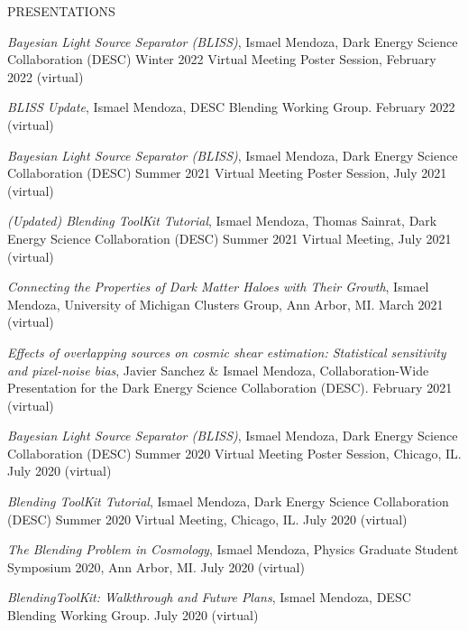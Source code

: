 \begin{rSection}{PRESENTATIONS}
%
\vspace*{-1em}

\item \textit{Bayesian Light Source Separator (BLISS)}, Ismael Mendoza, Dark Energy Science Collaboration (DESC) Winter 2022 Virtual Meeting Poster Session, February 2022 (virtual)

\item \textit{BLISS Update}, Ismael Mendoza, DESC Blending Working Group. February 2022 (virtual)

\item \textit{Bayesian Light Source Separator (BLISS)}, Ismael Mendoza, Dark Energy Science Collaboration (DESC) Summer 2021 Virtual Meeting Poster Session, July 2021 (virtual)

\item  \textit{(Updated) Blending ToolKit Tutorial}, Ismael Mendoza, Thomas Sainrat, Dark Energy Science Collaboration (DESC) Summer 2021 Virtual Meeting, July 2021 (virtual)

\item \textit{Connecting the Properties of Dark Matter Haloes with Their Growth}, Ismael Mendoza, University of Michigan Clusters Group, Ann Arbor, MI. March 2021 (virtual)
%
\item \textit{Effects of overlapping sources on cosmic shear estimation: Statistical sensitivity and pixel-noise bias}, Javier Sanchez \& Ismael Mendoza, Collaboration-Wide Presentation for the Dark Energy Science Collaboration (DESC). February 2021 (virtual)
%
\item \textit{Bayesian Light Source Separator (BLISS)}, Ismael Mendoza, Dark Energy Science Collaboration (DESC) Summer 2020 Virtual Meeting Poster Session, Chicago, IL. July 2020 (virtual)
%
\item  \textit{Blending ToolKit Tutorial}, Ismael Mendoza, Dark Energy Science Collaboration (DESC) Summer 2020 Virtual Meeting, Chicago, IL. July 2020 (virtual)
%
\item \textit{The Blending Problem in Cosmology}, Ismael Mendoza, Physics Graduate Student Symposium 2020, Ann Arbor, MI. July 2020 (virtual)
%
\item \textit{BlendingToolKit: Walkthrough and Future Plans}, Ismael Mendoza, DESC Blending Working Group. July 2020 (virtual)
\end{rSection}

